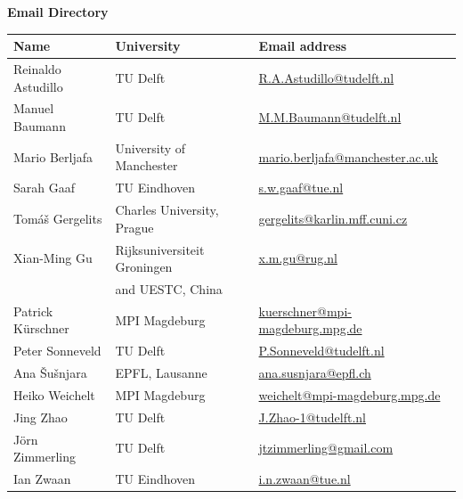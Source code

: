 \documentclass{article}
\begin{document}
\null\vfill\eject\thispagestyle{empty}\null\vfill\eject 












\newpage
\noindent\large{\textbf{Email Directory}}
\begin{table}[h!]
 \centering
\begin{tabular}{|l|l|l|}
 \hline
\textbf{Name} & \textbf{University} & \textbf{Email address} \\
\hline
Reinaldo Astudillo & TU Delft & \href{mailto:R.A.Astudillo@tudelft.nl}{R.A.Astudillo@tudelft.nl} \\
\hline
Manuel Baumann & TU Delft & \href{mailto:M.M.Baumann@tudelft.nl}{M.M.Baumann@tudelft.nl} \\
\hline
Mario Berljafa & University of Manchester & \href{mailto:mario.berljafa@manchester.ac.uk}{mario.berljafa@manchester.ac.uk} \\
\hline
Sarah Gaaf & TU Eindhoven & \href{mailto:s.w.gaaf@tue.nl}{s.w.gaaf@tue.nl} \\
\hline
Tom{\'a}{\v s} Gergelits & Charles University, Prague & \href{mailto:gergelits@karlin.mff.cuni.cz}{gergelits@karlin.mff.cuni.cz} \\
\hline
Xian-Ming Gu & Rijksuniversiteit Groningen  & \href{mailto:x.m.gu@rug.nl}{x.m.gu@rug.nl} \\
&and UESTC, China & \\
\hline
Patrick K\"{u}rschner & MPI Magdeburg & \href{mailto:kuerschner@mpi-magdeburg.mpg.de}{kuerschner@mpi-magdeburg.mpg.de} \\
\hline
Peter Sonneveld & TU Delft &\href{mailto:P.Sonneveld@tudelft.nl}{P.Sonneveld@tudelft.nl} \\
\hline
Ana {\v S}u{\v s}njara & EPFL, Lausanne & \href{mailto:ana.susnjara@epfl.ch}{ana.susnjara@epfl.ch} \\
\hline
Heiko Weichelt & MPI Magdeburg & \href{mailto:weichelt@mpi-magdeburg.mpg.de}{weichelt@mpi-magdeburg.mpg.de}\\
\hline
Jing Zhao & TU Delft & \href{mailto:J.Zhao-1@tudelft.nl}{J.Zhao-1@tudelft.nl} \\
\hline
J\"orn Zimmerling & TU Delft &\href{mailto:jtzimmerling@gmail.com}{jtzimmerling@gmail.com} \\
\hline
Ian Zwaan & TU Eindhoven &\href{mailto:i.n.zwaan@tue.nl}{i.n.zwaan@tue.nl} \\
\hline
\end{tabular}
\end{table}
\end{document}
